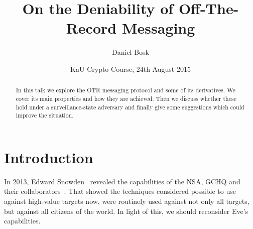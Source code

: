 \title[Deniability of OTR]{%
  On the Deniability of Off-The-Record Messaging
}
\author[D.~Bosk]{%
  Daniel Bosk
}
\date[kaucrypt 2015]{%
  KaU Crypto Course,
  24th August 2015
}


\mode* %

\begin{abstract}
  In this talk we explore the \ac{OTR} messaging protocol and some of its 
  derivatives.
  We cover its main properties and how they are achieved.
  Then we discuss whether these hold under a surveillance-state adversary and 
  finally give some suggestions which could improve the situation.

\end{abstract}




\acresetall{}
\section{Introduction}

In 2013, Edward Snowden~\cite{landau2013making} revealed the capabilities of 
the \ac{NSA}, \ac{GCHQ} and their collaborators~\cite[e.g.][]{nsa1,nsa2}.
That showed the techniques considered possible to use against high-value 
targets now, were routinely used against not only all targets, but against all 
citizens of the world.
In light of this, we should reconsider Eve's capabilities.

